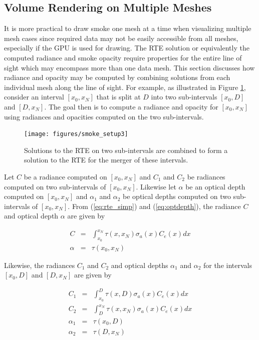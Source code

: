 \subsection{Volume Rendering on Multiple Meshes}
It is more practical to draw smoke one mesh at a time when visualizing multiple mesh cases since required data may not be easily accessible from all meshes, especially if the GPU is used for drawing.  The RTE solution or equivalently the computed radiance and smoke opacity require  properties for the entire line of sight which may encompass more than one data mesh.  This section discusses how  radiance and opacity may be computed by combining solutions from each individual mesh along the line of sight.  For example, as illustrated in Figure \ref{figsmokesetup3}, consider an interval $[x_0,x_N]$ that is split at $D$ into two sub-intervals $[x_0,D]$ and $[D,x_N]$.  The goal then is to compute a radiance and opacity for $[x_0,x_N]$ using radiances and opacities computed on  the two sub-intervals.

\begin{figure}[\figoptions]
\begin{center}
\texttt{[image: figures/smoke\_setup3]}
\end{center}
\caption {Solutions to the RTE on two sub-intervals are combined to form a solution to the RTE
for the merger of these intervals.}
\label{figsmokesetup3}
\end{figure}

Let $C$ be a radiance computed on $[x_0,x_N]$ and $C_1$ and $C_2$ be radiances computed on two sub-intervals of $[x_0,x_N]$.  Likewise let $\alpha$ be an optical depth computed on $[x_0,x_N]$ and $\alpha_1$ and $\alpha_2$ be optical depths computed on two sub-intervals of $[x_0,x_N]$.
From (\ref{eq:rte_simp}) and (\ref{eq:optdepth}), the radiance $C$ and optical depth $\alpha$ are given by

\begin{eqnarray*}
C&=&\int_{x_0}^{x_N}\tau(x,x_N)\sigma_a(x)C_e(x)dx\\
\alpha&=&\tau(x_0,x_N)
\end{eqnarray*}

Likewise, the radiances $C_1$ and $C_2$ and optical depths $\alpha_1$ and $\alpha_2$ for the intervals $[x_0,D]$ and $[D,x_N]$ are given by

\begin{eqnarray*}
C_1&=&\int_{x_0}^{D}\tau(x,D)\sigma_a(x)C_e(x)dx\\
C_2&=&\int_{D}^{x_N}\tau(x,x_N)\sigma_a(x)C_e(x)dx\\
\alpha_1&=&\tau(x_0,D)\\
\alpha_2&=&\tau(D,x_N)
\end{eqnarray*}

